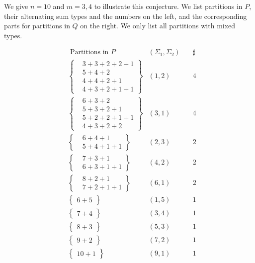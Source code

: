 \documentclass[draft]{amsart}
\numberwithin{equation}{section}
\theoremstyle{plain}
\theoremstyle{remark}
\newtheorem{example}[theorem]{Example}
\begin{document}
We give $n=10$ and $m=3, 4$ to illustrate this conjecture. 
We list partitions in $P$, their alternating sum types and the numbers on the left, and the corresponding parts for partitions in $Q$ on the right. We only list all partitions with mixed types.

\begin{minipage}{0.38\textwidth}
\small
\begin{align*}
& \mbox{ Partitions in $P$} &(\Sigma_{1}, \Sigma_{2})&\quad\sharp \\
&\left\{
\begin{array}{llll}
&3+3+2+2+1\\
&5+4+2\\
&4+4+2+1\\
&4+3+2+1+1
\end{array}
\right\} &(1, 2)   &\quad4 \\
&\left\{
\begin{array}{llll}
&6+3+2\\
&5+3+2+1\\
&5+2+2+1+1\\
&4+3+2+2
\end{array}
\right\} &(3,1)  &\quad4\\
&\left\{
\begin{array}{ll}
&6+4+1\\
&5+4+1+1
\end{array}
\right\} &(2,3)  &\quad2 \\
&\left\{
\begin{array}{ll}
&7+3+1\\
&6+3+1+1
\end{array}
\right\} &(4,2)  &\quad2\\
&\left\{
\begin{array}{ll}
&8+2+1\\
&7+2+1+1
\end{array}
\right\} &(6,1)  &\quad2\\
&\left\{
\begin{array}{l}
6+5
\end{array}
\right\} &(1,5)  &\quad1\\
&\left\{
\begin{array}{l}
7+4
\end{array}
\right\} &(3,4)  &\quad1\\
&\left\{
\begin{array}{l}
8+3
\end{array}
\right\} &(5,3)  &\quad1\\
&\left\{
\begin{array}{l}
9+2
\end{array}
\right\} &(7,2)  &\quad1\\
&\left\{
\begin{array}{l}
10+1
\end{array}
\right\} &(9,1)  &\quad1
 \end{align*}
\end{minipage}
\end{document}
